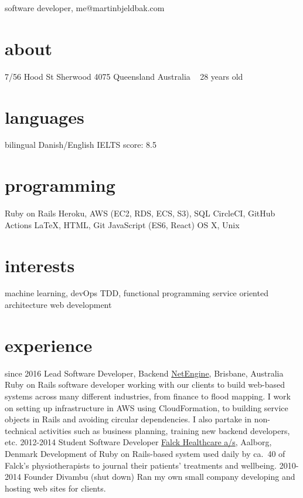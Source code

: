 \documentclass{afriggeri-cv/friggeri-cv}
\begin{document}
{software developer, me@martinbjeldbak.com}

\begin{aside}
  \section{about}
    7/56 Hood St
    Sherwood 4075
    Queensland
    Australia
    ~
    28 years old
  \section{languages}
    bilingual Danish/English
    IELTS score: 8.5
  \section{programming}
    Ruby on Rails
    Heroku, AWS (EC2, RDS, ECS, S3), SQL
    CircleCI, GitHub Actions
    \LaTeX, HTML, Git
    JavaScript (ES6, React)
    OS X, Unix
  \section{interests}
    machine learning, devOps
    TDD, functional programming
    service oriented architecture
    web development
\end{aside}

\section{experience}

\begin{entrylist}
  \entry%
    {since 2016}
    {Lead Software Developer, Backend}
    {\href{http://netengine.com.au/}{NetEngine}, Brisbane, Australia}
    {Ruby on Rails software developer working with our clients to build web-based systems across
      many different industries, from finance to flood mapping. I work on setting up infrastructure
      in AWS using CloudFormation, to building service objects in Rails and avoiding circular dependencies. I also partake in non-technical activities such as business planning, training new backend developers, etc.}
  \entry%
    {2012-2014}
    {Student Software Developer}
    {\href{http://www.falck.com/en/company/organisation/business-areas/healthcare}{Falck Healthcare a/s}, Aalborg, Denmark}
    {Development of Ruby on Rails-based system used daily by ca.\ 40 of Falck's physiotherapists to journal their patients' treatments and wellbeing.}
  \entry
    {2010-2014}
    {Founder}
    {Divambu (shut down)}
    {Ran my own small company developing and hosting web sites for clients.}
\end{entrylist}
\end{document}
